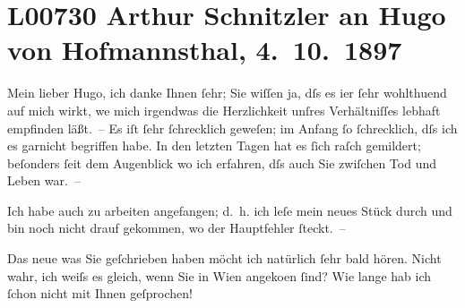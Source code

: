 

\section[Arthur Schnitzler an Hugo von Hofmannsthal, 4. 10. 1897]{L00730 Arthur Schnitzler an Hugo von Hofmannsthal, 4. 10. 1897}
\nopagebreak{}
\rehead{ }\normalsize\beginnumbering{}
\toendnotes[C]{\smallbreak\pagebreak[2]}
\toendnotes[C]{\smallbreak}
\pstart
           \noindent{}{\pb}Mein lieber Hugo, ich danke Ihnen ſehr; Sie wiſſen ja, dſs es i{\geminationm}er ſehr wohlthuend auf mich wirkt, we{\geminationn} mich irgendwas die Herzlichkeit unſres Verhältniſſes
               lebhaft empfinden läßt. – Es iſt ſehr ſchrecklich geweſen; im Anfang ſo ſchrecklich,
                  {\pb}dſs ich es garnicht begriffen habe. In den letzten
               Tagen hat es ſich raſch gemildert; beſonders ſeit dem Augenblick wo ich erfahren, dſs
               auch Sie
                zwiſchen Tod und Leben war. –\pend
           
\pstart
           Ich habe auch zu arbeiten angefangen; d. h. ich leſe mein neues Stück durch und bin noch nicht drauf
               gekommen, wo der Hauptfehler ſteckt. –\pend
           
\pstart
           {\pb}Das neue was Sie geſchrieben haben möcht ich natürlich ſehr
               bald hören. Nicht wahr, ich weiſs es gleich, wenn Sie in Wien angeko{\geminationm}en ſind? Wie lange hab
               ich ſchon nicht mit Ihnen geſprochen!\pend
           
